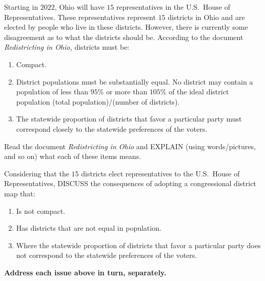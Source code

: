 \documentclass[noauthor,nooutcomes,hints,handout,12pt]{ximera}
\begin{document}
\begin{question}
  Starting in $2022$, Ohio will have $15$ representatives in the
  U.S.\ House of Representatives. These representatives represent $15$
  districts in Ohio and are elected by people who live in these
  districts. However, there is currently some disagreement as to what
  the districts should be. According to the document
  \textit{Redistricting in Ohio,} districts must be:
  \begin{enumerate}
  \item Compact.
  \item District populations must be substantially equal. No district
    may contain a population of less than $95\%$ or more than $105\%$
    of the ideal district population (total population)/(number of
    districts).
  \item The statewide proportion of districts that favor a particular
    party must correspond closely to the statewide preferences of the
    voters.
  \end{enumerate}
  Read the document \textit{Redistricting in Ohio} and EXPLAIN (using words/pictures, and so on) what each of these items means. 
\end{question}


\mynewpage

\begin{question}
  Considering that the $15$ districts elect representatives to the
  U.S.\ House of Representatives, DISCUSS the consequences of adopting
  a congressional district map that:
  \begin{enumerate}
  \item Is not compact.
  \item Has districts that are not equal in population.
  \item Where the statewide proportion of districts that favor a
    particular party does not correspond to the statewide preferences
    of the voters.
  \end{enumerate}
  \textbf{Address each issue above in turn, separately.} 
\end{question}
\end{document}

